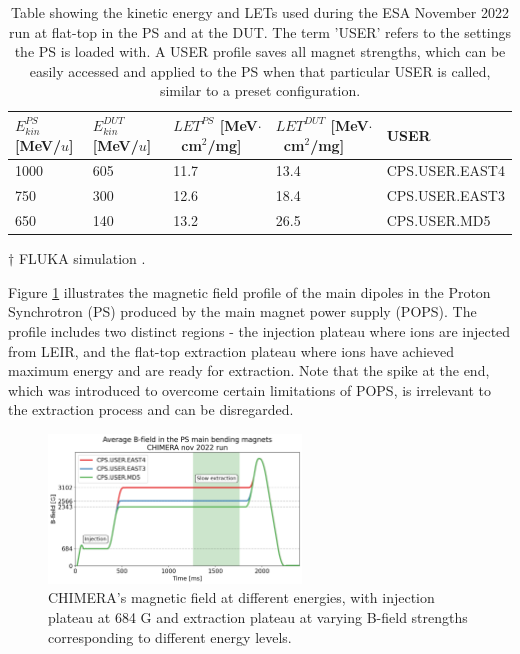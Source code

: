 \documentclass{cernatsnote}
\begin{document}
\begin{table}[!htbp]
\centering
\caption{Table showing the kinetic energy and LETs used during the ESA November 2022 run at flat-top in the PS and at the DUT. The term 'USER' refers to the settings the PS is loaded with. A USER profile saves all magnet strengths, which can be easily accessed and applied to the PS when that particular USER is called, similar to a preset configuration.}
\begin{threeparttable}
\label{tab:KE_table}
\begin{tabular}{@{}m{1.6cm}m{1.6cm}m{2.8cm}m{2.8cm}m{4cm}@{}}
\toprule
$E^{PS}_{kin}$ {[}MeV/$u${]} & $E^{DUT}_{kin}$\tnote{$\dagger$} [MeV/$u$] & $LET^{PS}$\tnote{$\dagger$} [MeV$\cdot$~cm$^2$/mg] & $LET^{DUT}$\tnote{$\dagger$} [MeV$\cdot$~cm$^2$/mg] & USER \\ \midrule
1000 & 605 & 11.7 & 13.4 & CPS.USER.EAST4 \\
750 & 300 & 12.6 & 18.4 & CPS.USER.EAST3 \\
650 & 140 & 13.2 & 26.5 & CPS.USER.MD5 \\ \bottomrule
\end{tabular}
\begin{tablenotes}
\item[$\dagger$] FLUKA simulation \cite{waets_tr1_2023}.
\end{tablenotes}
\end{threeparttable}
\end{table}


Figure \ref{fig:bfield} illustrates the magnetic field profile of the main dipoles in the Proton Synchrotron (PS) produced by the main magnet power supply (POPS). The profile includes two distinct regions - the injection plateau where ions are injected from LEIR, and the flat-top extraction plateau where ions have achieved maximum energy and are ready for extraction. Note that the spike at the end, which was introduced to overcome certain limitations of POPS, is irrelevant to the extraction process and can be disregarded.

\begin{figure}[!htb]
\centering
\includegraphics[width=0.6\textwidth]{images/PS_BEAM_ENERGY/average_b_field_chimera.png}
\caption{CHIMERA's magnetic field at different energies, with injection plateau at 684 G and extraction plateau at varying B-field strengths corresponding to different energy levels.}
\label{fig:bfield}
\end{figure}
\end{document}
